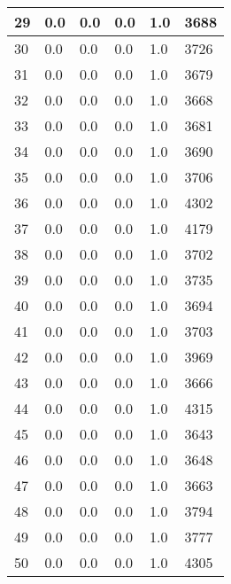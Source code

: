 \begin{longtable}{|l|l|l|l|l|l|}
29 & 0.0 & 0.0 & 0.0 & 1.0 & 3688 \\ \hline 
30 & 0.0 & 0.0 & 0.0 & 1.0 & 3726 \\ \hline 
31 & 0.0 & 0.0 & 0.0 & 1.0 & 3679 \\ \hline 
32 & 0.0 & 0.0 & 0.0 & 1.0 & 3668 \\ \hline 
33 & 0.0 & 0.0 & 0.0 & 1.0 & 3681 \\ \hline 
34 & 0.0 & 0.0 & 0.0 & 1.0 & 3690 \\ \hline 
35 & 0.0 & 0.0 & 0.0 & 1.0 & 3706 \\ \hline 
36 & 0.0 & 0.0 & 0.0 & 1.0 & 4302 \\ \hline 
37 & 0.0 & 0.0 & 0.0 & 1.0 & 4179 \\ \hline 
38 & 0.0 & 0.0 & 0.0 & 1.0 & 3702 \\ \hline 
39 & 0.0 & 0.0 & 0.0 & 1.0 & 3735 \\ \hline 
40 & 0.0 & 0.0 & 0.0 & 1.0 & 3694 \\ \hline 
41 & 0.0 & 0.0 & 0.0 & 1.0 & 3703 \\ \hline 
42 & 0.0 & 0.0 & 0.0 & 1.0 & 3969 \\ \hline 
43 & 0.0 & 0.0 & 0.0 & 1.0 & 3666 \\ \hline 
44 & 0.0 & 0.0 & 0.0 & 1.0 & 4315 \\ \hline 
45 & 0.0 & 0.0 & 0.0 & 1.0 & 3643 \\ \hline 
46 & 0.0 & 0.0 & 0.0 & 1.0 & 3648 \\ \hline 
47 & 0.0 & 0.0 & 0.0 & 1.0 & 3663 \\ \hline 
48 & 0.0 & 0.0 & 0.0 & 1.0 & 3794 \\ \hline 
49 & 0.0 & 0.0 & 0.0 & 1.0 & 3777 \\ \hline 
50 & 0.0 & 0.0 & 0.0 & 1.0 & 4305 \\ \hline 
\end{longtable}
